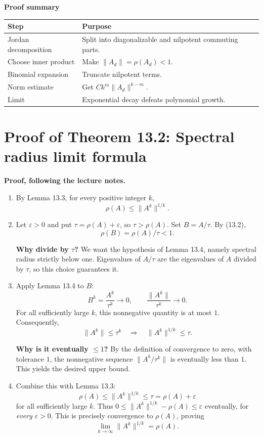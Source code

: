 \documentclass[11pt,a4paper]{article}
\newenvironment{proofsteps}{\begin{enumerate}\setlength{\itemsep}{4pt}}{\end{enumerate}}
\newcommand{\prooftable}[1]{\medskip\textbf{Proof summary}\par\smallskip #1\medskip}
\begin{document}
\prooftable{\begin{tabularx}{\linewidth}{@{}p{.27\linewidth}X@{}}\hline
Step & Purpose\\\hline
Jordan decomposition & Split into diagonalizable and nilpotent commuting parts.\\
Choose inner product & Make \(\|A_d\|=\rho(A_d)<1\).\\
Binomial expansion & Truncate nilpotent terms.\\
Norm estimate & Get \(Ck^m\|A_d\|^{k-m}\).\\
Limit & Exponential decay defeats polynomial growth.\\\hline
\end{tabularx}}

\section{Proof of Theorem 13.2: Spectral radius limit formula}
\textbf{Proof, following the lecture notes.}
\begin{proofsteps}
\item By Lemma 13.3, for every positive integer \(k\),
\[
 \rho(A)\leq\|A^k\|^{1/k}.
\]
\item Let \(\varepsilon>0\) and put \(\tau=\rho(A)+\varepsilon\), so \(\tau>\rho(A)\).
Set \(B=A/\tau\). By (13.2),
\[
 \boxed{\rho(B)=\rho(A)/\tau<1.}
\]
\begin{personalnote}
\textbf{Why divide by \(\tau\)?} We want the hypothesis of Lemma 13.4, namely spectral radius strictly below one. Eigenvalues of \(A/\tau\) are the eigenvalues of \(A\) divided by \(\tau\), so this choice guarantees it.
\end{personalnote}
\item Apply Lemma 13.4 to \(B\):
\[
 B^k=\frac{A^k}{\tau^k}\longrightarrow0,
 \qquad
 \frac{\|A^k\|}{\tau^k}\longrightarrow0.
\]
For all sufficiently large \(k\), this nonnegative quantity is at most \(1\). Consequently,
\[
 \|A^k\|\leq\tau^k
 \quad\Longrightarrow\quad
 \|A^k\|^{1/k}\leq\tau.
\]
\begin{personalnote}
\textbf{Why is it eventually \(\leq1\)?} By the definition of convergence to zero, with tolerance \(1\), the nonnegative sequence \(\|A^k/\tau^k\|\) is eventually less than \(1\). This yields the desired upper bound.
\end{personalnote}
\item Combine this with Lemma 13.3:
\[
 \boxed{\rho(A)\leq\|A^k\|^{1/k}\leq\tau=\rho(A)+\varepsilon}
\]
for all sufficiently large \(k\).
Thus
\(
0\leq\|A^k\|^{1/k}-\rho(A)\leq\varepsilon
\)
eventually, for \emph{every} \(\varepsilon>0\). This is precisely convergence to \(\rho(A)\), proving
\[
 \boxed{\lim_{k\to\infty}\|A^k\|^{1/k}=\rho(A).}
\]
\end{proofsteps}
\end{document}
